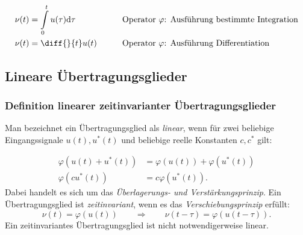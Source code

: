 
\begin{alignat*}{2}
  \nu(t) &= \int\limits_0^t u(\tau) \mathrm{d}\tau &\qquad &\text{Operator $\varphi$: Ausführung bestimmte Integration}\\
  \nu(t) &= \diff{}{t}u(t) &\qquad &\text{Operator $\varphi$: Ausführung Differentiation}
\end{alignat*}

\subsection{Lineare Übertragungsglieder} \label{sec:line-ubertr}

\subsubsection{Definition linearer zeitinvarianter Übertragungsglieder}\label{sec:defin-line-ubertr}
Man bezeichnet ein Übertragungsglied als \emph{linear}, wenn für zwei beliebige Eingangssignale $u(t), u^\ast(t)$ und beliebige reelle Konstanten $c, c^\ast$ gilt:

\begin{subequations}
\begin{align}
\varphi(u(t) + u^\ast(t)) &= \varphi(u(t)) + \varphi(u^\ast(t)) \label{eq:UebPrinzip}\\[2ex]
\varphi (cu^\ast(t)) &= c\varphi (u^\ast(t)) \label{eq:VerstPrinzip}.
\end{align}
\end{subequations}
Dabei handelt es sich um das \emph{Überlagerungs- und Verstärkungsprinzip}.
Ein Übertragungsglied ist \emph{zeitinvariant}, wenn es das \emph{Verschiebungsprinzip} erfüllt:
\begin{equation} \label{eq:VerschPrinzip}
  \nu(t) = \varphi(u(t)) \qquad \Rightarrow \qquad \nu(t - \tau) = \varphi(u(t - \tau)).
\end{equation}
Ein zeitinvariantes Übertragungsglied ist nicht notwendigerweise linear.

